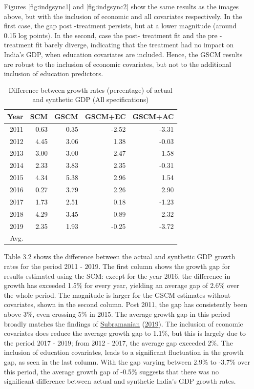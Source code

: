 \documentclass[12pt,nobind, a4paper]{reedthesis}
\begin{document}
 Figures \ref{fig:indgsync1} and \ref{fig:indgsync2} show the same results as the images above, but with the inclusion of economic and all covariates respectively. In the first case, the gap post -treatment persists, but at a lower magnitude (around 0.15 log points). In the second, case the post- treatment fit and the pre - treatment fit barely diverge, indicating that the treatment had no impact on India's GDP, when education covariates are included. Hence, the GSCM results are robust to the inclusion of economic covariates, but not to the additional inclusion of education predictors.
 \linebreak

 \newrobustcmd{\B}{\bfseries}
 \begin{table}[h!!]
 \centering
 \begin{tabular}{rrrrr}
 \hline
 Year & SCM & GSCM & GSCM+EC & GSCM+AC\\
 \hline
 2011 & 0.63 & 0.35 & -2.52 & -3.31\\
 \hline
 2012 & 4.45 & 3.06 & 1.38 & -0.03\\
 \hline
 2013 & 3.00 & 3.00 & 2.47 & 1.58\\
 \hline
 2014 & 2.33 & 3.83 & 2.35 & -0.31\\
 \hline
 2015 & 4.34 & 5.38 & 2.96 & 1.54\\
 \hline
 2016 & 0.27 & 3.79 & 2.26 & 2.90\\
 \hline
 2017 & 1.73 & 2.51 & 0.18 & -1.23\\
 \hline
 2018 & 4.29 & 3.45 & 0.89 & -2.32\\
 \hline
 2019 & 2.35 & 1.93 & -0.25 & -3.72\\
 \hline
 \B Avg. & \B 2.6 & \B 3.0 & \B 1.1& \B -0.5\\
 \hline
 \end{tabular}
 \caption{Difference between growth rates (percentage) of actual and synthetic GDP (All specifications)}
 \end{table}
 Table 3.2 shows the difference between the actual and synthetic GDP growth rates for the period 2011 - 2019. The first column shows the growth gap for results estimated using the SCM: except for the year 2016, the difference in growth has exceeded 1.5\% for every year, yielding an average gap of 2.6\% over the whole period. The magnitude is larger for the GSCM estimates without covariates, shown in the second column. Post 2011, the gap has consistently been above 3\%, even crossing 5\% in 2015. The average growth gap in this period broadly matches the findings of \protect\hyperlink{ref-subramanian_indias_2019}{Subramanian} (\protect\hyperlink{ref-subramanian_indias_2019}{2019}). The inclusion of economic covariates does reduce the average growth gap to 1.1\%, but this is largely due to the period 2017 - 2019; from 2012 - 2017, the average gap exceeded 2\%. The inclusion of education covariates, leads to a significant fluctuation in the growth gap, as seen in the last column. With the gap varying between 2.9\% to -3.7\% over this period, the average growth gap of -0.5\% suggests that there was no significant difference between actual and synthetic India's GDP growth rates.
\end{document}
